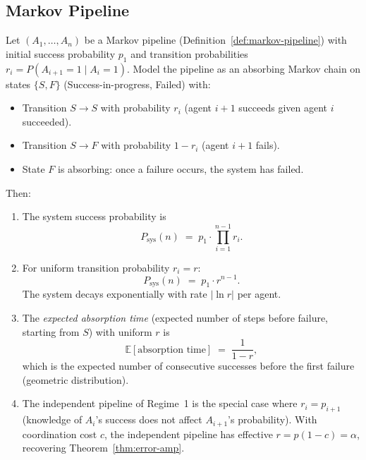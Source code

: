 \subsection{Markov Pipeline}

\begin{theorem}
\label{thm:markov-pipeline}
Let $(A_1, \ldots, A_n)$ be a Markov pipeline (Definition~\ref{def:markov-pipeline})
with initial success probability $p_1$ and transition probabilities $r_i = P(A_{i+1}=1 \mid A_i=1)$.
Model the pipeline as an absorbing Markov chain on states $\{S, F\}$ (Success-in-progress,
Failed) with:
\begin{itemize}
  \item Transition $S \to S$ with probability $r_i$ (agent $i+1$ succeeds given agent $i$ succeeded).
  \item Transition $S \to F$ with probability $1 - r_i$ (agent $i+1$ fails).
  \item State $F$ is absorbing: once a failure occurs, the system has failed.
\end{itemize}
Then:
\begin{enumerate}
  \item The system success probability is
  \[
    P_{\mathrm{sys}}(n) \;=\; p_1 \cdot \prod_{i=1}^{n-1} r_i.
  \]

  \item For uniform transition probability $r_i = r$:
  \[
    P_{\mathrm{sys}}(n) \;=\; p_1 \cdot r^{n-1}.
  \]
  The system decays exponentially with rate $|\ln r|$ per agent.

  \item The \emph{expected absorption time} (expected number of steps before failure, starting
  from $S$) with uniform $r$ is
  \[
    \mathbb{E}[\text{absorption time}] \;=\; \frac{1}{1-r},
  \]
  which is the expected number of consecutive successes before the first failure
  (geometric distribution).

  \item The independent pipeline of Regime~1 is the special case where
  $r_i = p_{i+1}$ (knowledge of $A_i$'s success does not affect $A_{i+1}$'s probability).
  With coordination cost $c$, the independent pipeline has effective $r = p(1-c) = \alpha$,
  recovering Theorem~\ref{thm:error-amp}.
\end{enumerate}
\end{theorem}

